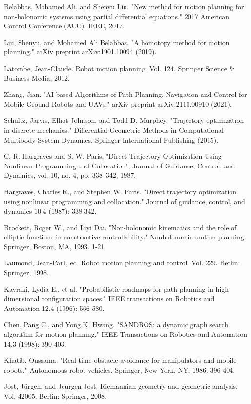 \documentclass[letterpaper, 10 pt, conference]{ieeeconf}
\begin{document}

\begin{thebibliography}{8}

Belabbas, Mohamed Ali, and Shenyu Liu. "New method for motion planning for non-holonomic systems using partial differential equations." 2017 American Control Conference (ACC). IEEE, 2017.

Liu, Shenyu, and Mohamed Ali Belabbas. "A homotopy method for motion planning." arXiv preprint arXiv:1901.10094 (2019).

Latombe, Jean-Claude. Robot motion planning. Vol. 124. Springer Science & Business Media, 2012.

Zhang, Jian. "AI based Algorithms of Path Planning, Navigation and Control for Mobile Ground Robots and UAVs." arXiv preprint arXiv:2110.00910 (2021).

Schultz, Jarvis, Elliot Johnson, and Todd D. Murphey. "Trajectory optimization in discrete mechanics." Differential-Geometric Methods in Computational Multibody System Dynamics. Springer International Publishing (2015).

C. R. Hargraves and S. W. Paris, "Direct Trajectory Optimization Using Nonlinear Programming and Collocation", Journal of Guidance, Control, and Dynamics, vol. 10, no. 4, pp. 338–342, 1987.

Hargraves, Charles R., and Stephen W. Paris. "Direct trajectory optimization using nonlinear programming and collocation." Journal of guidance, control, and dynamics 10.4 (1987): 338-342.

Brockett, Roger W., and Liyi Dai. "Non-holonomic kinematics and the role of elliptic functions in constructive controllability." Nonholonomic motion planning. Springer, Boston, MA, 1993. 1-21.

Laumond, Jean-Paul, ed. Robot motion planning and control. Vol. 229. Berlin: Springer, 1998.

Kavraki, Lydia E., et al. "Probabilistic roadmaps for path planning in high-dimensional configuration spaces." IEEE transactions on Robotics and Automation 12.4 (1996): 566-580.

Chen, Pang C., and Yong K. Hwang. "SANDROS: a dynamic graph search algorithm for motion planning." IEEE Transactions on Robotics and Automation 14.3 (1998): 390-403.

Khatib, Oussama. "Real-time obstacle avoidance for manipulators and mobile robots." Autonomous robot vehicles. Springer, New York, NY, 1986. 396-404.

Jost, Jürgen, and Jèurgen Jost. Riemannian geometry and geometric analysis. Vol. 42005. Berlin: Springer, 2008.

\end{thebibliography}
\end{document}
